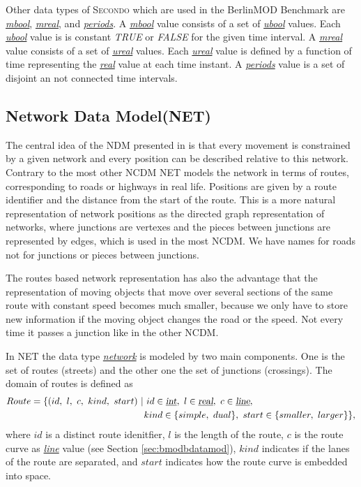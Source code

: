 \documentclass[a4paper]{article}
\newcommand{\secondo}{\textsc{Secondo}}
\newcommand{\bmodb} {BerlinMOD Benchmark}
\newcommand{\dt}[1]{\textsl{\underline{#1}}}
\newcommand{\true}{\textsl{TRUE}}
\newcommand{\false}{\textsl{FALSE}}
\begin{document}
Other data types of \secondo{} which are used in the \bmodb{} are \dt{mbool},
\dt{mreal}, and \dt{periods}. A \dt{mbool} value consists of a set of \dt{ubool}
values. Each \dt{ubool} value is is constant \true{} or \false{} for the given
time interval. A \dt{mreal} value consists of a set of \dt{ureal} values. Each
\dt{ureal} value is defined by a function of time representing the \dt{real}
value at each time instant. A \dt{periods} value is a set of disjoint an not
connected time intervals.
\subsection{Network Data Model(NET)}
\label{sec:netdatamod}
The central idea of the NDM presented in \cite{NetworkGueting} is that
every movement is constrained by a given network and every position can be described
relative to this network. Contrary to the most other NCDM NET models the network
in terms of routes, corresponding to roads or highways in real life. Positions
are given by a route identifier and the distance from the start of the route.
This is a more natural representation of network positions as the directed graph
representation of networks, where junctions are vertexes and the pieces between
junctions are represented by edges, which is used in the most NCDM. We have names
for roads not for junctions or pieces between junctions.

The routes based network representation has also the advantage that the
representation of moving objects that move over several sections of the same route
with constant speed becomes much smaller, because we only have to store new
information if the moving object changes the road or the speed. Not every time
it passes a junction like in the other NCDM.

In NET the data type \dt{network} is modeled by two main components. One is the set of
routes (streets) and the other one the set of junctions (crossings). The domain
of routes is defined as
\[
\begin{split}
Route = \{(id,\ l,\ c,\ kind,\ start)\ &|\ id \in \dt{int},\ l \in \dt{real},
\ c \in \dt{line},\\
&\ kind \in \{simple,\ dual\},\ start \in \{smaller,\ larger\}\},
\end{split}
\]
where $id$ is a distinct route idenitfier, $l$ is the length of the route, $c$ is the
route curve as \dt{line} value (see Section \ref{sec:bmodbdatamod}), $kind$
indicates if the lanes of the route are separated, and $start$ indicates how
the route curve is embedded into space.
\end{document}
